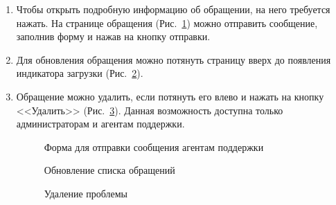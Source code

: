\documentclass{../includes/TechDoc}
\begin{document}
\begin{enumerate}
        \item Чтобы открыть подробную информацию об обращении, на него требуется нажать.
        На странице обращения (Рис.~\ref{ris:problem_input_message}) можно отправить сообщение, заполнив форму и нажав на кнопку отправки.
        \item Для обновления обращения можно потянуть страницу вверх до появления индикатора загрузки (Рис.~\ref{ris:problem_list_refresh}).
        \item Обращение можно удалить, если потянуть его влево и нажать на кнопку <<Удалить>> (Рис.~\ref{ris:problem_delete}).
        Данная возможность доступна только администраторам и агентам поддержки.
        \begin{figure}[h]
            \centering
            \caption{Форма для отправки сообщения агентам поддержки}
            \label{ris:problem_input_message}
        \end{figure}
        \begin{figure}[h]
            \centering
            \caption{Обновление списка обращений}
            \label{ris:problem_list_refresh}
        \end{figure}
        \begin{figure}[h]
            \centering
            \caption{Удаление проблемы}
            \label{ris:problem_delete}
        \end{figure}


\end{enumerate}
\end{document}
